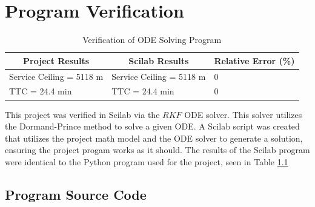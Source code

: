 \documentclass[12pt]{report}
\begin{document}
%
%
\begin{appendices}



\chapter{Program Verification}
\label{App:Program Verification}

\begin{table}
\caption{Verification of ODE Solving Program}
\label{table:verify}
\centering
\renewcommand{\arraystretch}{1.25}
\begin{tabular}{l l l}
\hline\hline
\multicolumn{1}{c}{Project Results} &
\multicolumn{1}{c}{Scilab Results} & 
\multicolumn{1}{c}{Relative Error (\%)} \\
\hline
Service Ceiling = 5118 m & Service Ceiling = 5118 m & 0 \\
TTC = 24.4 min & TTC = 24.4 min & 0 \\
\hline\hline
\end{tabular}
\normalsize
\end{table}

This project was verified in Scilab via the $RKF$ ODE solver. This solver utilizes the Dormand-Prince method to solve a given
ODE. A Scilab script was created that utilizes the project math model and the ODE solver to generate a solution, ensuring
the project progam works as it should. The results of the Scilab program were identical to the Python program used for the
project, seen in Table \ref{table:verify}

\newpage
\begin{landscape}  %
\thispagestyle{empty} %

\chapter{Program Source Code}
\label{App:Program Source Code}



\end{landscape}
\end{appendices}
\end{document}
